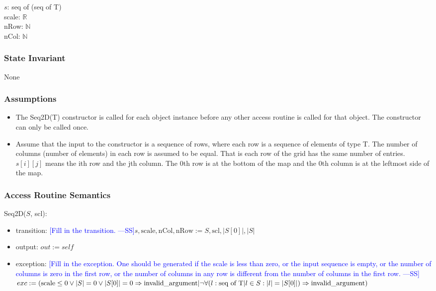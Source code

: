 \documentclass[12pt]{article}
\newcommand{\authornote}[3]{\textcolor{#1}{[#3 ---#2]}}
\newcommand{\authornote}[3]{}
\newcommand{\wss}[1]{\authornote{blue}{SS}{#1}}
\begin{document}
$s$: seq of (seq of T)\\
scale: $\mathbb{R}$\\
nRow: $\mathbb{N}$\\
nCol: $\mathbb{N}$

\subsubsection* {State Invariant}

None

\subsubsection* {Assumptions}

\begin{itemize}
\item The Seq2D(T) constructor is called for each object instance before any
other access routine is called for that object.  The constructor can only be
called once.
\item Assume that the input to the constructor is a sequence of rows, where each
  row is a sequence of elements of type T.  The number of columns (number of
  elements) in each row is assumed to be equal. That is each row
  of the grid has the same number of entries.  $s[i][j]$ means the ith row and
  the jth column.  The 0th row is at the bottom of the map and the 0th column
  is at the leftmost side of the map.
\end{itemize}

\subsubsection* {Access Routine Semantics}

Seq2D($S$, scl):
\begin{itemize}
\item transition: \wss{Fill in the transition.}$s, \mbox{scale}, \mbox{nCol}, \mbox{nRow} := S,
  \mbox{scl}, |S[0]|, |S|$
\item output: $\mathit{out} := \mathit{self}$
\item exception: \wss{Fill in the exception.  One should be generated if the
    scale is less than zero, or the input sequence is empty, or the number of
    columns is zero in the first row, or the number of columns in any row is
    different from the number of columns in the first row.}$exc := (\mbox{scale} \leq 0 \lor |S| = 0 \lor |S[0]| = 0 \Rightarrow \mbox{invalid\_argument}|\\
  \lnot\forall(l : \mbox{seq of T}|l \in S : |l| = |S[0]|) \Rightarrow
  \mbox{invalid\_argument})$
\end{itemize}
\end{document}

